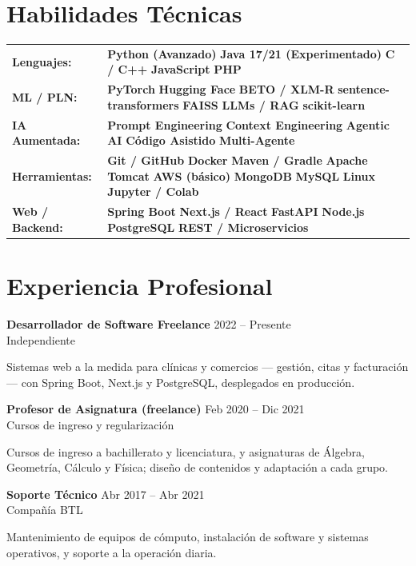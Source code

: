 \documentclass[10pt,letterpaper]{article}
\newcommand{\entry}[4]{%
  \noindent
  \textbf{#1} \hfill {\small\color{textsec}#2}\\
  {\small\color{accent}#3}
  \vspace{0.08cm}
  \par\noindent#4
  \par\vspace{0.16cm}
}
\newcommand{\skill}[1]{{\footnotesize\bfseries\color{primary}\hspace{0.5mm}\hspace{1mm}#1\hspace{1mm}}}
\begin{document}
\section*{Habilidades T\'{e}cnicas}
\small
\noindent
\begin{tabular}{@{}p{2.9cm}@{}>{\RaggedLeft\arraybackslash}p{\dimexpr\textwidth-2.9cm\relax}@{}}
{\bfseries\color{primary} Lenguajes:} & \skill{Python (Avanzado)} \skill{Java 17/21 (Experimentado)} \skill{C / C++} \skill{JavaScript} \skill{PHP} \\[0.1cm]
{\bfseries\color{primary} ML / PLN:} & \skill{PyTorch} \skill{Hugging Face} \skill{BETO / XLM-R} \skill{sentence-transformers} \skill{FAISS} \skill{LLMs / RAG} \skill{scikit-learn} \\[0.1cm]
{\bfseries\color{primary} IA Aumentada:} & \skill{Prompt Engineering} \skill{Context Engineering} \skill{Agentic AI} \skill{C\'{o}digo Asistido} \skill{Multi-Agente} \\[0.1cm]
{\bfseries\color{primary} Herramientas:} & \skill{Git / GitHub} \skill{Docker} \skill{Maven / Gradle} \skill{Apache Tomcat} \skill{AWS (b\'{a}sico)} \skill{MongoDB} \skill{MySQL} \skill{Linux} \skill{Jupyter / Colab} \\[0.1cm]
{\bfseries\color{primary} Web / Backend:} & \skill{Spring Boot} \skill{Next.js / React} \skill{FastAPI} \skill{Node.js} \skill{PostgreSQL} \skill{REST / Microservicios}
\end{tabular}

\vspace{0.5cm}
\section*{Experiencia Profesional}
\entry{Desarrollador de Software Freelance}
       {2022 -- Presente}
       {Independiente}
       {Sistemas web a la medida para cl\'{i}nicas y comercios — gesti\'{o}n, citas y facturaci\'{o}n — con Spring Boot, Next.js y PostgreSQL, desplegados en producci\'{o}n.}

\entry{Profesor de Asignatura (freelance)}
       {Feb 2020 -- Dic 2021}
       {Cursos de ingreso y regularizaci\'{o}n}
       {Cursos de ingreso a bachillerato y licenciatura, y asignaturas de \'{A}lgebra, Geometr\'{i}a, C\'{a}lculo y F\'{i}sica; dise\~{n}o de contenidos y adaptaci\'{o}n a cada grupo.}

\entry{Soporte T\'{e}cnico}
       {Abr 2017 -- Abr 2021}
       {Compa\~{n}\'{i}a BTL}
       {Mantenimiento de equipos de c\'{o}mputo, instalaci\'{o}n de software y sistemas operativos, y soporte a la operaci\'{o}n diaria.}
\end{document}
